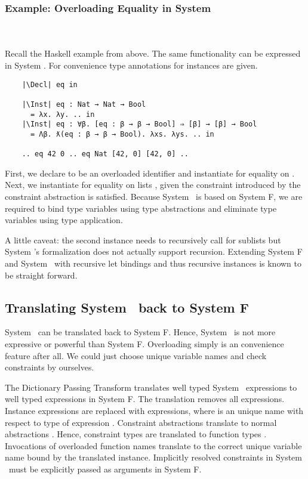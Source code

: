 \subsubsection{Example: Overloading Equality in System \Fo}\hfill\\\\
Recall the Haskell example from above. 
The same functionality can be expressed in System \Fo. 
For convenience type annotations for instances are given.
\begin{verbatim}
    |\Decl| eq in

    |\Inst| eq : Nat → Nat → Bool 
      = λx. λy. .. in
    |\Inst| eq : ∀β. [eq : β → β → Bool] ⇒ [β] → [β] → Bool 
      = Λβ. ƛ(eq : β → β → Bool). λxs. λys. .. in

    .. eq 42 0 .. eq Nat [42, 0] [42, 0] .. 
\end{verbatim} 
First, we declare  to be an overloaded identifier and instantiate  for equality on . 
Next, we instantiate  for equality on lists \inl{[β]}, given the constraint  introduced by the constraint abstraction  is satisfied. 
Because System \Fo\ is based on System F, we are required to bind type variables using type abstractions  and eliminate type variables using type application. 

\noindent A little caveat: the second instance needs to recursively call  for sublists but System \Fo's formalization does not actually support recursion. Extending System F and System \Fo\ with recursive let bindings and thus recursive instances is known to be straight forward. 

\subsection{Translating System \Fo\ back to System F}
System \Fo\ can be translated back to System F. Hence, System \Fo\ is not more expressive or powerful than System F. Overloading simply is an convenience feature after all. We could just choose unique variable names and check constraints by ourselves.

\noindent The Dictionary Passing Transform translates well typed System \Fo\ expressions to well typed expressions in System F.
The translation removes all  expressions. Instance expressions  are replaced with  expressions, where  is an unique name with respect to type  of expression . 
Constraint abstractions  translate to normal abstractions . 
Hence, constraint types  are translated to function types . 
Invocations of overloaded function names  translate to the correct unique variable name  bound by the translated instance.
Implicitly resolved constraints in System \Fo\ must be explicitly passed as arguments in System F.

